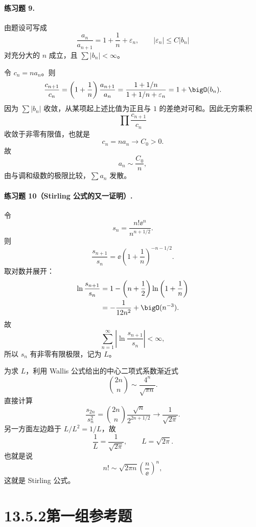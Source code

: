 \paragraph{练习题 9.}
\begin{xsolution}
由题设可写成
\[
 \frac{a_n}{a_{n+1}}
 =1+\frac1n+\varepsilon_n,
 \qquad |\varepsilon_n|\leq C|b_n|
\]
对充分大的 $n$ 成立，且 $\sum|b_n|<\infty$。

令 $c_n=na_n$。则
\[
 \frac{c_{n+1}}{c_n}
 =\left(1+\frac1n\right)\frac{a_{n+1}}{a_n}
 =\frac{1+1/n}{1+1/n+\varepsilon_n}
 =1+\bigO(b_n).
\]
因为 $\sum|b_n|$ 收敛，从某项起上述比值为正且与 $1$ 的差绝对可和。因此无穷乘积
\[
 \prod\frac{c_{n+1}}{c_n}
\]
收敛于非零有限值，也就是
\[
 c_n=na_n\longrightarrow C_0>0.
\]
故
\[
 a_n\sim\frac{C_0}{n},
\]
由与调和级数的极限比较，$\sum a_n$ 发散。
\end{xsolution}

\paragraph{练习题 10（Stirling 公式的又一证明）.}
\begin{xsolution}
令
\[
 s_n=\frac{n!\ee^n}{n^{n+1/2}}.
\]
则
\[
 \frac{s_{n+1}}{s_n}
 =\ee\left(1+\frac1n\right)^{-n-1/2}.
\]
取对数并展开：
\[
 \begin{aligned}
 \ln\frac{s_{n+1}}{s_n}
 &=1-\left(n+\frac12\right)\ln\left(1+\frac1n\right)\\
 &=-\frac1{12n^2}+\bigO(n^{-3}).
 \end{aligned}
\]
故
\[
 \sum_{n=1}^{\infty}\left|\ln\frac{s_{n+1}}{s_n}\right|<\infty,
\]
所以 $s_n$ 有非零有限极限，记为 $L$。

为求 $L$，利用 Wallis 公式给出的中心二项式系数渐近式
\[
 \binom{2n}{n}\sim\frac{4^n}{\sqrt{\pi n}}.
\]
直接计算
\[
 \frac{s_{2n}}{s_n^2}
 =\binom{2n}{n}\frac{\sqrt n}{2^{2n+1/2}}
 \longrightarrow\frac1{\sqrt{2\pi}}.
\]
另一方面左边趋于 $L/L^2=1/L$，故
\[
 \frac1L=\frac1{\sqrt{2\pi}},
 \qquad
 \boxed{L=\sqrt{2\pi}}.
\]
也就是说
\[
 n!\sim\sqrt{2\pi n}\left(\frac n\ee\right)^n,
\]
这就是 Stirling 公式。
\end{xsolution}

\section*{13.5.2\quad 第一组参考题}


